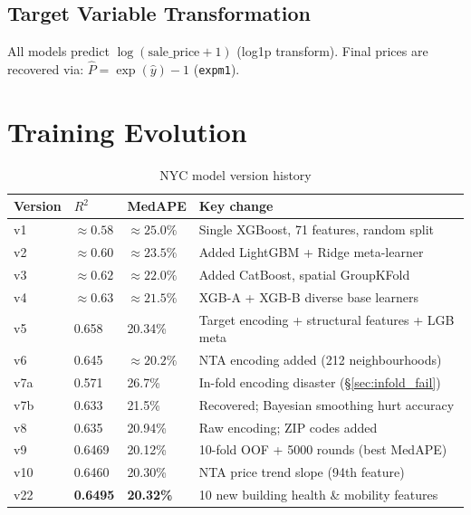\documentclass[11pt, a4paper, twoside]{article}
\begin{document}
\subsection{Target Variable Transformation}
All models predict $\log(\text{sale\_price} + 1)$ (log1p transform). Final
prices are recovered via: $\hat{P} = \exp(\hat{y}) - 1$ (\texttt{expm1}).

\section{Training Evolution}
\label{sec:training_evolution}

\begin{table}[H]
  \centering
  \caption{NYC model version history}
  \label{tab:version_history}
  \begin{tabular}{llll}
    \toprule
    Version & $R^2$ & MedAPE & Key change \\
    \midrule
    v1  & $\approx 0.58$ & $\approx 25.0\%$ & Single XGBoost, 71 features, random split \\
    v2  & $\approx 0.60$ & $\approx 23.5\%$ & Added LightGBM + Ridge meta-learner \\
    v3  & $\approx 0.62$ & $\approx 22.0\%$ & Added CatBoost, spatial GroupKFold \\
    v4  & $\approx 0.63$ & $\approx 21.5\%$ & XGB-A + XGB-B diverse base learners \\
    v5  & 0.658 & 20.34\% & Target encoding + structural features + LGB meta \\
    v6  & 0.645 & $\approx 20.2\%$ & NTA encoding added (212 neighbourhoods) \\
    v7a & 0.571 & 26.7\%  & In-fold encoding disaster (\S\ref{sec:infold_fail}) \\
    v7b & 0.633 & 21.5\%  & Recovered; Bayesian smoothing hurt accuracy \\
    v8  & 0.635 & 20.94\% & Raw encoding; ZIP codes added \\
    v9  & 0.6469& 20.12\% & 10-fold OOF + 5000 rounds (best MedAPE) \\
    v10 & 0.6460& 20.30\% & NTA price trend slope (94th feature) \\
    v22 & \textbf{0.6495}& \textbf{20.32\%} & 10 new building health \& mobility features \\
    \bottomrule
  \end{tabular}
\end{table}
\end{document}

